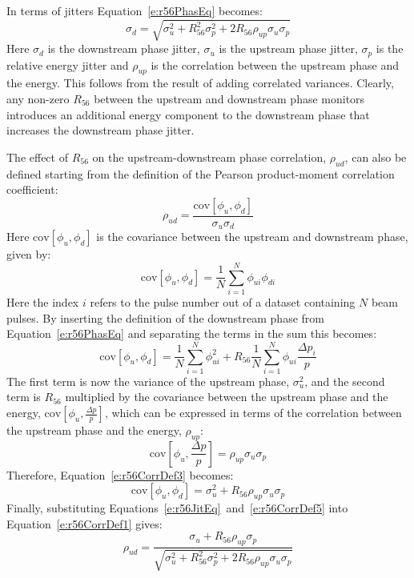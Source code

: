 In terms of jitters Equation~\ref{e:r56PhasEq} becomes:
\begin{equation}
\sigma_d = \sqrt{\sigma_u^2 + R_{56}^2\sigma_{p}^2 + 2R_{56}\rho_{up}\sigma_{u}\sigma_{p}}
\label{e:r56JitEq}
\end{equation}
Here \(\sigma_d\) is the downstream phase jitter, \(\sigma_u\) is the upstream phase jitter, \(\sigma_p\) is the relative energy jitter and \(\rho_{up}\) is the correlation between the upstream phase and the energy. This follows from the result of adding correlated variances. Clearly, any non-zero \(R_{56}\) between the upstream and downstream phase monitors introduces an additional energy component to the downstream phase that increases the downstream phase jitter.

The effect of \(R_{56}\) on the upstream-downstream phase correlation, \(\rho_{ud}\), can also be defined starting from the definition of the Pearson product-moment correlation coefficient:
\begin{equation}
\rho_{ud} = \frac{\mathrm{cov}\left[\phi_u,\phi_d\right]}{\sigma_u\sigma_d}
\label{e:r56CorrDef1}
\end{equation}
Here \(\mathrm{cov}\left[\phi_u,\phi_d\right]\) is the covariance between the upstream and downstream phase, given by:
\begin{equation}
 \mathrm{cov}\left[\phi_u,\phi_d\right] = \frac{1}{N} \sum_{i=1}^{N}\phi_{ui}\phi_{di}
\label{e:r56CorrDef2}
\end{equation} 
Here the index \(i\) refers to the pulse number out of a dataset containing \(N\) beam pulses. By inserting the definition of the downstream phase from Equation~\ref{e:r56PhasEq} and separating the terms in the sum this becomes:
\begin{equation}
\mathrm{cov}\left[\phi_u,\phi_d\right] = \frac{1}{N} \sum_{i=1}^{N}\phi_{ui}^{2} + R_{56}\frac{1}{N} \sum_{i=1}^{N}\phi_{ui}\frac{\Delta p_i}{p}
\label{e:r56CorrDef3}
\end{equation}
The first term is now the variance of the upstream phase, \(\sigma_u^2\), and the second term is \(R_{56}\) multiplied by the covariance between the upstream phase and the energy, \(\mathrm{cov}\left[\phi_u,\frac{\Delta p}{p}\right]\), which can be expressed in terms of the correlation between the upstream phase and the energy, \(\rho_{up}\):
\begin{equation}
\mathrm{cov}\left[\phi_u,\frac{\Delta p}{p}\right] = \rho_{up}\sigma_u\sigma_{p}
\label{e:r56CorrDef4}
\end{equation}
Therefore, Equation~\ref{e:r56CorrDef3} becomes:
\begin{equation}
\mathrm{cov}\left[\phi_u,\phi_d\right] = \sigma_u^2 + R_{56}\rho_{up}\sigma_u\sigma_p
\label{e:r56CorrDef5}
\end{equation}
Finally, substituting Equations~\ref{e:r56JitEq}~and~\ref{e:r56CorrDef5} into Equation~\ref{e:r56CorrDef1} gives:
\begin{equation}
\rho_{ud} = \frac{\sigma_u + R_{56}\rho_{up}\sigma_p}{\sqrt{\sigma_u^2 + R_{56}^2\sigma_{p}^2 + 2R_{56}\rho_{up}\sigma_{u}\sigma_{p}}}
\label{e:r56CorrDefFinal}
\end{equation}

